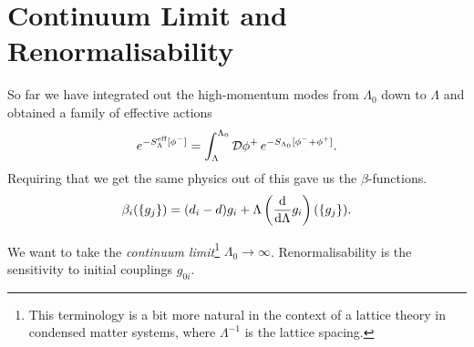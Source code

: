 
\section{Continuum Limit and Renormalisability}%
\label{sec:continuum_limit_and_renormalisability}

So far we have integrated out the high-momentum modes from $\Lambda_0$ down to $\Lambda$ and obtained a family of effective actions
\begin{equation}
  e^{-S_\Lambda^{\text{eff}}[\phi^-]} = \int_\Lambda^{\Lambda_0} \mathop{\mathcal{D} \phi^+} e^{-S_{\Lambda_0} [\phi^- + \phi^+]}.
\end{equation}
Requiring that we get the same physics out of this gave us the $\beta$-functions.
\begin{equation}
  \beta_i (\{g_j\}) = (d_i - d)g_i + \Lambda \left( \dv{\Lambda} g_i \right) (\{g_j\}).
\end{equation}

We want to take the \emph{continuum limit}\footnote{This terminology is a bit more natural in the context of a lattice theory in condensed matter systems, where $\Lambda^{-1}$ is the lattice spacing.} $\Lambda_0 \to \infty$.
Renormalisability is the sensitivity to initial couplings $g_{0 i}$.

\begin{figure}[tbhp]
  \centering
  \def\svgwidth{0.4\columnwidth}
  
  \caption{}
  \label{fig:l15f1}
\end{figure}

